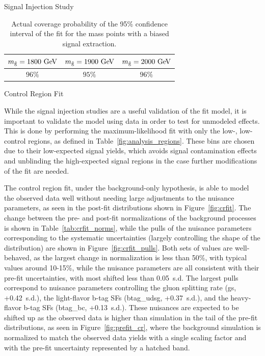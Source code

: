 \begin{subsection}{Signal Injection Study}
\begin{table}[tbp!]
\centering
\begin{tabular}{ |c|c|c| }
\hline
$m_{\tilde{\mathrm{g}}} = 1800~\mathrm{Ge\kern -0.1em V}$ & $m_{\tilde{\mathrm{g}}} = 1900~\mathrm{Ge\kern -0.1em V}$ & $m_{\tilde{\mathrm{g}}} = 2000~\mathrm{Ge\kern -0.1em V}$ \\ \hline
$96\%$              & $95\%$              & $96\%$              \\ \hline
\end{tabular}
\caption{Actual coverage probability of the 95\% confidence interval of the fit for the mass points with a biased signal extraction.}
\label{tab:siginj_coverage}
\end{table}

\end{subsection}

\begin{subsection}{Control Region Fit}
\label{subsec:crfit}

While the signal injection studies are a useful validation of the fit model, it is important to validate the model using data in order to test for unmodeled effects.
This is done by performing the maximum-likelihood fit with only the low-\Njets, low-\MJ control regions, as defined in Table~\ref{fig:analysis_regions}.
These bins are chosen due to their low-expected signal yields, which avoids signal contamination effects and unblinding the high-expected signal regions in the case further modifications of the fit are needed.

The control region fit, under the background-only hypothesis, is able to model the observed data well without needing large adjustments to the nuisance parameters, as seen in the post-fit \Nb distributions shown in Figure~\ref{fig:crfit}.
The change between the pre- and post-fit normalizations of the background processes is shown in Table~\ref{tab:crfit_norms}, while the pulls of the nuisance parameters corresponding to the systematic uncertainties (largely controlling the shape of the \Nb distribution) are shown in Figure~\ref{fig:crfit_pulls}.
Both sets of values are well-behaved, as the largest change in normalization is less than 50\%, with typical values around 10-15\%, while the nuisance parameters are all consistent with their pre-fit uncertainties, with most shifted less than 0.05~s.d.
The largest pulls correspond to nuisance parameters controlling the gluon splitting rate (gs, +0.42~s.d.), the light-flavor b-tag SFs (btag\_udsg, +0.37~s.d.), and the heavy-flavor b-tag SFs (btag\_bc, +0.13~s.d.).
These nuisances are expected to be shifted up as the observed data is higher than simulation in the tail of the pre-fit \Nb distributions, as seen in Figure~\ref{fig:prefit_cr}, where the background simulation is normalized to match the observed data yields with a single scaling factor and with the pre-fit uncertainty represented by a hatched band.


\end{subsection}
